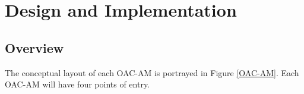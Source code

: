 \documentclass[11pt]{report}
\begin{document}








\chapter{Design and Implementation}

\section{Overview}
The conceptual layout of each OAC-AM is portrayed in Figure \ref{OAC-AM}. Each OAC-AM will have four points of entry.
\end{document}
